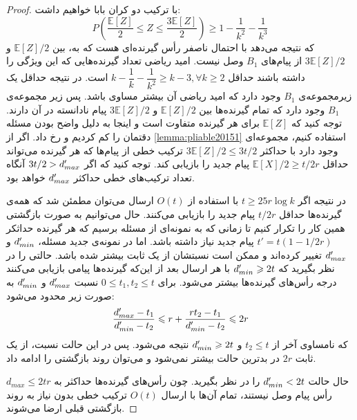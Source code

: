 \begin{proof}
    با ترکیب دو کران بابا خواهیم داشت:
    \begin{equation}
        P(\dfrac{\mathbb{E}[Z]}{2} \leq Z \leq \dfrac{3\mathbb{E}[Z]}{2}) \geq 1 - \dfrac{1}{k^2} - \dfrac{1}{k^3}
    \end{equation}
    که نتیجه می‌دهد با احتمال ناصفر رأس گیرنده‌ای هست که به، بین
    $\mathbb{E}[Z]/2$
    و
    $3\mathbb{E}[Z]/2$
    از پیام‌های
    $B_1$
    وصل نیست. امید ریاضی تعداد گیرنده‌هایی که این ویژگی را داشته باشند حداقل
    $k - \dfrac{1}{k} - \dfrac{1}{k^2} \geq k - 3, \forall k \geq 2$
    است. در نتیجه حداقل یک زیرمجموعه‌ی
    $B_1$
    وجود دارد که امید ریاضی آن بیشتر مساوی باشد. پس زیر مجموعه‌ی
    $B_1$
    وجود دارد که تمام گیرنده‌ها بین
    $\mathbb{E}[Z] / 2$
    و
    $3\mathbb{E}[Z]/2$
    پیام نادانسته در آن دارند. توجه کنید که
    $\mathbb{E}[Z]$
    برای هر گیرنده متفاوت است و اینجا به دلیل واضح بودن مسئله دقتمان را کم کردیم و
    رخ داد. اگر از
    \autoref{lemma:pliable20151}
    استفاده کنیم، مجموعه‌ای وجود دارد با حداکثر
    $3\mathbb{E}[Z]/2 \leq 3t/2$
    ترکیب خطی از پیام‌ها که هر گیرنده می‌تواند حداقل
    $\mathbb{E}[X]/2 \geq t/2r$
    پیام جدید را بازیابی کند. توجه کنید که اگر
    $3t/2 > d_{max}'$
    آنگاه تعداد ترکیب‌های خطی حداکثر
    $d_{max}'$
    خواهد بود.

    در نتیجه اگر
    $t \geq 25 r \log k$
    با استفاده از
    $O(t)$
    ارسال می‌توان مطمئن شد که همه‌ی گیرنده‌ها حداقل
    $t/2r$
    پیام جدید را بازیابی می‌کنند. حال می‌توانیم به صورت بازگشتی همین کار را تکرار کنیم تا زمانی که به نمونه‌ای از مسئله برسیم که هر گیرنده حداثکر
    $t' = t(1 - 1/2r)$
    پیام جدید نیاز داشته باشد. اما در نمونه‌ی جدید مسئله،
    $d_{min}'$
    و
    $d_{max}'$
    تغییر کرده‌اند و ممکن است نسبتشان از یک ثابت بیشتر شده باشد. حالتی را در نظر بگیرید که
    $d_{min}' \geqslant 2t$
    با هر ارسال بعد از این‌که گیرنده‌ها پیامی بازیابی می‌کنند درجه رأس‌های گیرنده‌ها بیشتر می‌شود. برای
    $0 \leq t_1, t_2 \leq t$
    نسبت
    $d_{max}'$
    و
    $d_{min}'$
    به صورت زیر محدود می‌شود:
    \begin{equation}
        \dfrac{d_{max}' - t_1}{d_{min}' - t_2} \leqslant r + \dfrac{rt_2 - t_1}{d_{min}' - t_2} \leqslant 2r
    \end{equation}
    که نامساوی آخر از
    $t_2 \leq t$
    و
    $d_{min}' \geqslant 2t$
    نتیجه می‌شود. پس در این حالت نسبت، از یک ثابت
    $2r$
    در بدترین حالت بیشتر نمی‌شود و می‌توان روند بازگشتی را ادامه داد.

    حال حالت
    $d_{min}' < 2t$
    را در نظر بگیرید. چون رأس‌های گیرنده‌ها حداکثر به
    $d_{max} \leq 2tr$
    رأس پیام وصل نیستند، تمام آن‌ها با ارسال
    $O(t)$
    ترکیب خطی بدون نیاز به روند بازگشتی قبلی ارضا می‌شوند.


\end{proof}
